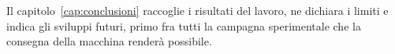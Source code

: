 Il capitolo~\ref{cap:conclusioni} raccoglie i risultati del lavoro, ne dichiara i
limiti e indica gli sviluppi futuri, primo fra tutti la campagna sperimentale che
la consegna della macchina renderà possibile.
